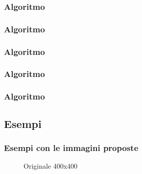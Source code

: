 \documentclass{beamer}
\begin{document}
\begin{frame}
\frametitle{Algoritmo}



\end{frame}

\begin{frame}
	\frametitle{Algoritmo}

\end{frame}

\begin{frame}
	\frametitle{Algoritmo}
	
\end{frame}

\begin{frame}
	\frametitle{Algoritmo}
	
\end{frame}

\begin{frame}
	\frametitle{Algoritmo}
	
\end{frame}

\subsection{Esempi}

\begin{frame}
\frametitle{Esempi con le immagini proposte}
\begin{figure}
		\caption{Originale 400x400}
\end{figure}

\end{frame}
\end{document}
